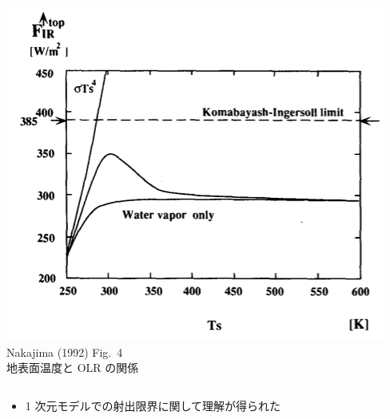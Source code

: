 \documentclass[aspectratio=149,9pt,]{beamer}
\begin{document}
\begin{frame}
\begin{columns}[T,onlytextwidth]
\begin{column}{.4\textwidth}
			\includegraphics[width=\textwidth]{nf4.png}\\
			\scriptsize Nakajima \etal (1992) Fig.\ 4\\地表面温度と OLR の関係
		\end{column}
	\end{columns}
	\begin{itemize}
		\item 1 次元モデルでの射出限界に関して理解が得られた
	\end{itemize}
\end{frame}
\end{document}
